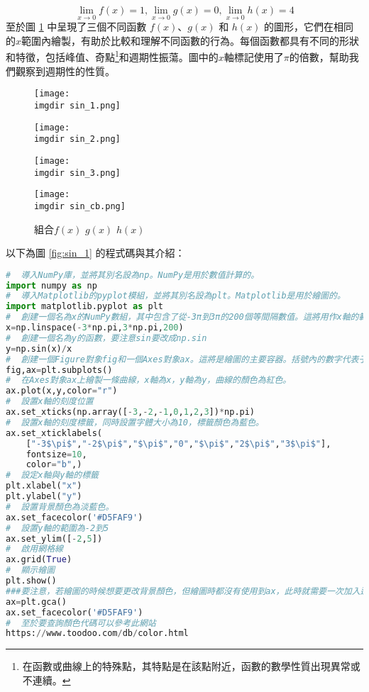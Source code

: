 \documentclass[12pt, a4paper]{article}
\begin{document}
$$\lim_{x \rightarrow 0}f(x)=1,\lim_{x \rightarrow 0}g(x)=0,\lim_{x \rightarrow 0}h(x)=4$$
至於圖 \ref{fig:sin_combine} 中呈現了三個不同函數 $f(x)$、$g(x)$ 和 $h(x)$ 的圖形，它們在相同的$x$範圍內繪製，有助於比較和理解不同函數的行為。每個函數都具有不同的形狀和特徵，包括峰值、奇點\footnote{在函數或曲線上的特殊點，其特點是在該點附近，函數的數學性質出現異常或不連續。}和週期性振蕩。圖中的$x$軸標記使用了$\pi$的倍數，幫助我們觀察到週期性的性質。
\begin{figure}[htbp]
\centering
\begin{minipage}{0.49\linewidth}
\centering
\texttt{[image: \\imgdir sin\_1.png]}
\caption{$f(x)=\frac{sin(x)}{x}$}
\label{fig:sin_1}
\end{minipage}
\begin{minipage}{0.49\linewidth}
\centering
\texttt{[image: \\imgdir sin\_2.png]}
\caption{$g(x)=\frac{sin(x^2)}{x}$}
\label{fig:sin_2}
\end{minipage}
\qquad
\begin{minipage}{0.49\linewidth}
\centering
\texttt{[image: \\imgdir sin\_3.png]}
\caption{$h(x)=\frac{sin^2(2x)}{x^2}$}
\label{fig:sin_3}
\end{minipage}
\begin{minipage}{0.49\linewidth}
\centering
\texttt{[image: \\imgdir sin\_cb.png]}
\caption{組合$f(x)$ $g(x)$ $h(x)$}
\label{fig:sin_combine}
\end{minipage}
\end{figure}
\newpage
以下為圖 \ref{fig:sin_1} 的程式碼與其介紹：
\begin{lstlisting}[language=Python]
#  導入NumPy庫，並將其別名設為np。NumPy是用於數值計算的。
import numpy as np
#  導入Matplotlib的pyplot模組，並將其別名設為plt。Matplotlib是用於繪圖的。
import matplotlib.pyplot as plt
#  創建一個名為x的NumPy數組，其中包含了從-3π到3π的200個等間隔數值。這將用作x軸的範圍。
x=np.linspace(-3*np.pi,3*np.pi,200)
#  創建一個名為y的函數，要注意sin要改成np.sin
y=np.sin(x)/x  
#  創建一個Figure對象fig和一個Axes對象ax。這將是繪圖的主要容器。括號內的數字代表子圖數量
fig,ax=plt.subplots()
#  在Axes對象ax上繪製一條曲線，x軸為x，y軸為y，曲線的顏色為紅色。
ax.plot(x,y,color="r")
#  設置x軸的刻度位置
ax.set_xticks(np.array([-3,-2,-1,0,1,2,3])*np.pi)
#  設置x軸的刻度標籤，同時設置字體大小為10，標籤顏色為藍色。
ax.set_xticklabels(
    ["-3$\pi$","-2$\pi$","$\pi$","0","$\pi$","2$\pi$","3$\pi$"],
    fontsize=10,
    color="b",)
#  設定x軸與y軸的標籤
plt.xlabel("x")
plt.ylabel("y")
#  設置背景顏色為淡藍色。
ax.set_facecolor('#D5FAF9')
#  設置y軸的範圍為-2到5
ax.set_ylim([-2,5])
#  啟用網格線
ax.grid(True)
#  顯示繪圖
plt.show()
###要注意，若繪圖的時候想要更改背景顏色，但繪圖時都沒有使用到ax，此時就需要一次加入這兩行。
ax=plt.gca()
ax.set_facecolor('#D5FAF9')
#  至於要查詢顏色代碼可以參考此網站
https://www.toodoo.com/db/color.html
	\end{lstlisting}
\end{document}
